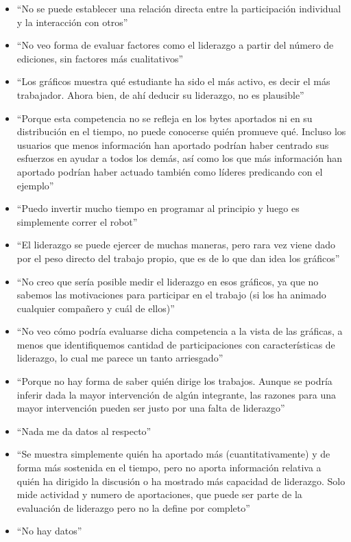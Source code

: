 \begin{itemize}
\item ``No se puede establecer una relación directa entre la participación individual y la interacción con otros''
\item ``No veo forma de evaluar factores como el liderazgo a partir del número de ediciones, sin factores más cualitativos''
\item ``Los gráficos muestra qué estudiante ha sido el más activo, es decir el más trabajador. Ahora bien, de ahí deducir su liderazgo, no es plausible''
\item ``Porque esta competencia no se refleja en los bytes aportados ni en su distribución en el tiempo, no puede conocerse quién promueve qué. Incluso los usuarios que menos información han aportado podrían haber centrado sus esfuerzos en ayudar a todos los demás, así como los que más información han aportado podrían haber actuado también como líderes predicando con el ejemplo''
\item ``Puedo invertir mucho tiempo en programar al principio y luego es simplemente correr el robot''
\item ``El liderazgo se puede ejercer de muchas maneras, pero rara vez viene dado por el peso directo del trabajo propio, que es de lo que dan idea los gráficos''
\item ``No creo que sería posible medir el liderazgo en esos gráficos, ya que no sabemos las motivaciones para participar en el trabajo (si los ha animado cualquier compañero y cuál de ellos)''
\item ``No veo cómo podría evaluarse dicha competencia a la vista de las gráficas, a menos que identifiquemos cantidad de participaciones con características de liderazgo, lo cual me parece un tanto arriesgado''
\item ``Porque no hay forma de saber quién dirige los trabajos. Aunque se podría inferir dada la mayor intervención de algún integrante, las razones para una mayor intervención pueden ser justo por una falta de liderazgo''
\item ``Nada me da datos al respecto''
\item ``Se muestra simplemente quién ha aportado más (cuantitativamente) y de forma más sostenida en el tiempo, pero no aporta información relativa a quién ha dirigido la discusión o ha mostrado más capacidad de liderazgo. Solo mide actividad y numero de aportaciones, que puede ser parte de la evaluación de liderazgo pero no la define por completo''
\item ``No hay datos''

\end{itemize}
